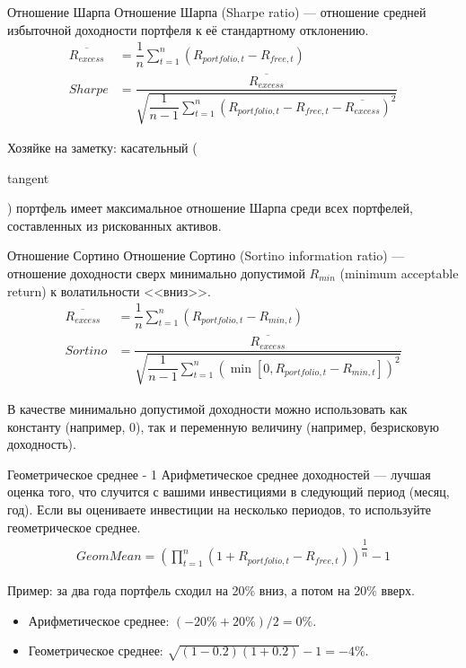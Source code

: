 \documentclass{beamer}
\newcommand{\en}[1]{\begin{otherlanguage}{english}#1\end{otherlanguage}}
\begin{document}
\begin{frame}{Отношение Шарпа}
\justify
Отношение Шарпа (Sharpe ratio) --- отношение средней избыточной доходности 
портфеля к её стандартному отклонению.
\begin{align*}
\overline{R_{excess}}
&= \dfrac{1}{n}\sum\limits_{t=1}^{n}(R_{portfolio,t} - R_{free,t})\\
Sharpe &= \dfrac{\overline{R_{excess}}}
{\sqrt{\dfrac{1}{n-1}\sum\limits_{t=1}^{n}(R_{portfolio,t} - R_{free,t} - 
\overline{R_{excess}})^2}}
\end{align*}

\justify
Хозяйке на заметку: касательный (\en{tangent}) портфель имеет максимальное 
отношение Шарпа среди всех портфелей, составленных из рискованных активов.
\end{frame}



\begin{frame}{Отношение Сортино}
\justify
Отношение Сортино (Sortino information ratio) --- отношение доходности сверх 
минимально допустимой $R_{min}$ (minimum acceptable return) к волатильности 
<<вниз>>.
\begin{align*}
\overline{R_{excess}} &=
\dfrac{1}{n}\sum\limits_{t=1}^{n}(R_{portfolio,t} - R_{min,t}) \\
Sortino &= \dfrac{
	\overline{R_{excess}}
}{
	\sqrt{\dfrac{1}{n-1}\sum\limits_{t=1}^{n}
		\left(\min[0, R_{portfolio,t} - R_{min, t}]\right)^2}
}
\end{align*}

\justify
В качестве минимально допустимой доходности можно использовать как константу 
(например, 0), так и переменную величину (например, безрисковую доходность).
\end{frame}



\begin{frame}{Геометрическое среднее - 1}
\justify
Арифметическое среднее доходностей --- лучшая оценка того, что случится с 
вашими инвестициями в следующий период (месяц, год). Если вы оцениваете 
инвестиции на несколько периодов, то используйте геометрическое среднее.
\begin{align*}
Geom Mean = \left(
\prod\limits_{t=1}^{n}(1 + R_{portfolio,t} - R_{free,t})
\right)^{\dfrac{1}{n}} - 1
\end{align*}

\justify
Пример: за два года портфель сходил на 20\% вниз, а потом на 20\% вверх.
\begin{itemize}
\justifying
\item Арифметическое среднее: $(-20\%+20\%)/2 = 0\%$.
\item Геометрическое среднее: $\sqrt{(1-0.2)(1+0.2)} - 1 = -4\%$. 
\end{itemize}
\end{frame}
\end{document}

